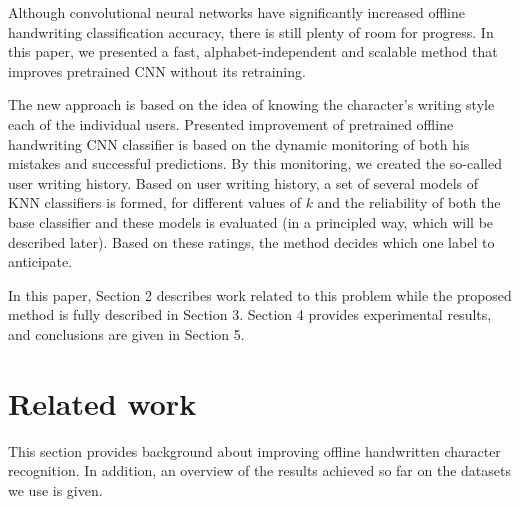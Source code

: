 \documentclass{article}
\begin{document}
Although convolutional neural networks have significantly increased offline handwriting classification accuracy, there is still plenty of room for progress.
In this paper, we presented a fast, alphabet-independent and scalable method that improves pretrained CNN without its retraining.

The new approach is based on the idea of knowing the character's writing style each of the individual users.
Presented improvement of pretrained offline handwriting CNN classifier is based on the dynamic monitoring of both his mistakes and successful predictions.
By this monitoring, we created the so-called user writing history.
Based on user writing history, a set of several models of KNN classifiers is formed, for different values of $k$ and the reliability of both the base classifier and these models is evaluated (in a principled way, which will be described later).
Based on these ratings, the method decides which one label to anticipate.

In this paper, Section 2 describes work related to this problem while the proposed method is fully described in Section 3.
Section 4 provides experimental results, and conclusions are given in Section 5.

\section{Related work}  %

This section provides background about improving offline handwritten character recognition.
In addition, an overview of the results achieved so far on the datasets we use is given.
\end{document}
